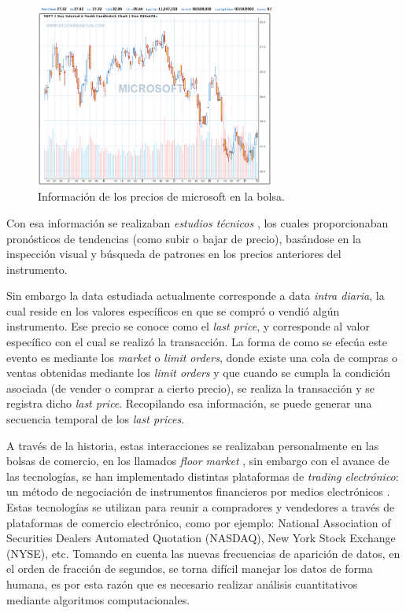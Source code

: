 \begin{figure}[h!t]
    \begin{center}
        \includegraphics[width=0.7\textwidth]{images/microsoft}
        \caption{Información de los precios de microsoft en la bolsa.}
        \label{fig:microsoft}
    \end{center}
\end{figure}

Con esa información se realizaban \emph{estudios técnicos}
\cite{taylor1992use}, los cuales proporcionaban pronósticos de tendencias (como
subir o bajar de precio), basándose en la inspección visual y búsqueda de
patrones en los precios anteriores del instrumento. 

Sin embargo la data estudiada actualmente corresponde a data \emph{intra
diaria}, la cual reside en los valores específicos en que se compró o vendió
algún instrumento.  Ese precio se conoce como el \emph{last price}, y
corresponde al valor específico con el cual se realizó la transacción. La forma
de como se efecúa este evento es mediante los \emph{market} o \emph{limit
orders}, donde existe una cola de compras o ventas obtenidas mediante los
\emph{limit orders} y que cuando se cumpla la condición asociada (de vender o
comprar a cierto precio), se realiza la transacción y se registra dicho
\emph{last price}. Recopilando esa información, se puede generar una secuencia
temporal de los \emph{last prices}. 

A través de la historia, estas interacciones se realizaban personalmente en las
bolsas de comercio, en los llamados \emph{floor market}
\cite{jain2005financial}, sin embargo con el avance de las tecnologías, se han
implementado distintas plataformas de \emph{trading electrónico}: un método de
negociación de instrumentos financieros por medios electrónicos
\cite{weston2002electronic}. Estas tecnologías se utilizan para reunir a
compradores y vendedores a través de plataformas de comercio electrónico, como
por ejemplo: National Association of Securities Dealers Automated Quotation
(NASDAQ), New York Stock Exchange (NYSE), etc. Tomando en cuenta las nuevas
frecuencias de aparición de datos, en el orden de fracción de segundos, se
torna difícil manejar los datos de forma humana, es por esta razón que es
necesario realizar análisis cuantitativos mediante algoritmos computacionales.

